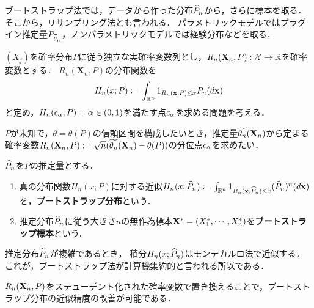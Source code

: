 \documentclass[uplatex,dvipdfmx]{jsreport}
\begin{document}
\begin{tcolorbox}[colframe=ForestGreen, colback=ForestGreen!10!white,breakable,colbacktitle=ForestGreen!40!white,coltitle=black,fonttitle=\bfseries\sffamily,
title=]
    ブートストラップ法では，データから作った分布$\widehat{P}_n$から，さらに標本を取る．そこから，リサンプリング法とも言われる．
    パラメトリックモデルではプラグイン推定量$P_{\widehat{\theta}_n}$，ノンパラメトリックモデルでは経験分布などを取る．
\end{tcolorbox}

\begin{notation}
    $(X_j)$を確率分布$P$に従う独立な実確率変数列とし，$R_n(\mathbf{X}_n,P):\mathcal{X}\to\mathbb{R}$を確率変数とする．
    $R_n(\mathbf{X}_n,P)$の分布関数を
    \[H_n(x;P):=\int_{\mathbb{R}^n}1_{R_n(\mathbf{x},P)\le x}P_n(d\mathbf{x})\]
    と定め，$H_n(c_\alpha;P)=\alpha\in(0,1)$を満たす点$c_\alpha$を求める問題を考える．
\end{notation}
\begin{example}
    $P$が未知で，$\theta=\theta(P)$の信頼区間を構成したいとき，推定量$\widetilde{\theta_n}(\mathbf{X}_n)$から定まる確率変数$R_n(\mathbf{X}_n,P):=\sqrt{n}(\widetilde{\theta_n}(\mathbf{X}_n)-\theta(P))$の分位点$c_\alpha$を求めたい．
\end{example}

\begin{definition}
    $\widehat{P}_n$を$P$の推定量とする．
    \begin{enumerate}
        \item 真の分布関数$H_n(x;P)$に対する近似$H_n(x;\widehat{P}_n):=\int_{\mathbb{R}^n}1_{R_n(\mathbf{x},\widehat{P}_n)\le x}(\widehat{P}_n)^n(d\mathbf{x})$を，\textbf{ブートストラップ分布}という．
        \item 推定分布$\widehat{P}_n$に従う大きさ$n$の無作為標本$\mathbf{X}^*=(X^*_1,\cdots,X^*_n)$を\textbf{ブートストラップ標本}という．
    \end{enumerate}
\end{definition}
\begin{remark}
    推定分布$\widetilde{P}_n$が複雑であるとき，
    積分$H_n(x;\widehat{P}_n)$はモンテカルロ法で近似する．
    これが，ブートストラップ法が計算機集約的と言われる所以である．
\end{remark}
\begin{remark}[studentization]
    $R_n(\mathbf{X}_n,P)$をステューデント化された確率変数で置き換えることで，ブートストラップ分布の近似精度の改善が可能である．
\end{remark}
\end{document}
